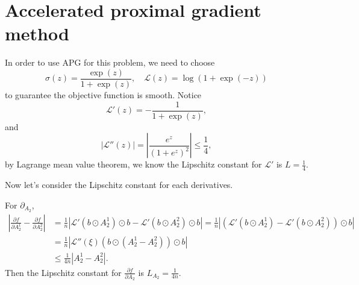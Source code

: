 \documentclass{article}
\newcommand{\ml}{\mathcal{L}}
\numberwithin{equation}{section}
\numberwithin{figure}{section}
\begin{document}
\section{Accelerated proximal gradient method}

In order to use APG for this problem, we need to choose 
\begin{equation}
\sigma(z) = \frac{\exp(z)}{1+\exp(z)}, \quad \mathcal{L}(z) = \log(1+\exp(-z))
\end{equation}
to guarantee the objective function is smooth. Notice
\begin{equation}
\mathcal{L}'(z) = -\frac{1}{1+\exp(z)}, 
\end{equation}
and
\begin{equation}
|\ml''(z)| = \left|\frac{e^z}{(1+e^z)^2}\right| \le \frac{1}{4},
\end{equation}
by Lagrange mean value theorem, we know the Lipschitz constant for $\ml'$ is $L=\frac{1}{4}$.

Now let's consider the Lipschitz constant for each derivatives. 

For $\partial_{A_2} $,
\begin{equation}
\begin{aligned}
\left|\frac{\partial f}{\partial A_2^1} - \frac{\partial f}{\partial A_2^2}\right| &= \frac{1}{n}|\mathcal{L}'(b\odot A_2^1)\odot b - \mathcal{L}'(b\odot A_2^2)\odot b| = \frac{1}{n}|(\mathcal{L}'(b\odot A_2^1) - \mathcal{L}'(b\odot A_2^2))\odot b| \\
&= \frac{1}{n} |\ml''(\xi)(b\odot(A_2^1 - A_2^2))\odot b| \\
&\le \frac{1}{4n}|A_2^1 - A_2^2|.
\end{aligned}
\end{equation}
Then the Lipschitz constant for $\frac{\partial f}{\partial A_2} $ is $L_{A_2} = \frac{1}{4n} $.
\end{document}
